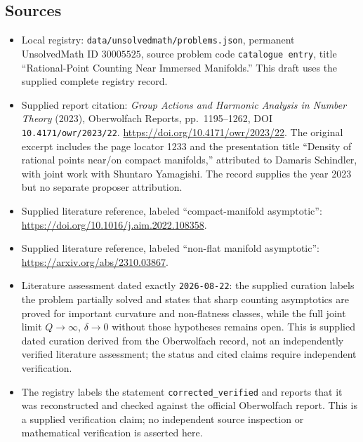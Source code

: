 \documentclass[11pt]{article}
\begin{document}
\subsection{Sources}
\begin{itemize}
\item Local registry: \texttt{data/unsolvedmath/problems.json}, permanent UnsolvedMath ID \(30005525\), source problem code \texttt{catalogue entry}, title ``Rational-Point Counting Near Immersed Manifolds.'' This draft uses the supplied complete registry record.
\item Supplied report citation: \emph{Group Actions and Harmonic Analysis in Number Theory} (2023), Oberwolfach Reports, pp.\ 1195--1262, DOI \texttt{10.4171/owr/2023/22}. \url{https://doi.org/10.4171/owr/2023/22}. The original excerpt includes the page locator 1233 and the presentation title ``Density of rational points near/on compact manifolds,'' attributed to Damaris Schindler, with joint work with Shuntaro Yamagishi. The record supplies the year 2023 but no separate proposer attribution.
\item Supplied literature reference, labeled ``compact-manifold asymptotic'': \url{https://doi.org/10.1016/j.aim.2022.108358}.
\item Supplied literature reference, labeled ``non-flat manifold asymptotic'': \url{https://arxiv.org/abs/2310.03867}.
\item Literature assessment dated exactly \texttt{2026-08-22}: the supplied curation labels the problem partially solved and states that sharp counting asymptotics are proved for important curvature and non-flatness classes, while the full joint limit \(Q\to\infty\), \(\delta\to0\) without those hypotheses remains open. This is supplied dated curation derived from the Oberwolfach record, not an independently verified literature assessment; the status and cited claims require independent verification.
\item The registry labels the statement \texttt{corrected\_verified} and reports that it was reconstructed and checked against the official Oberwolfach report. This is a supplied verification claim; no independent source inspection or mathematical verification is asserted here.
\end{itemize}
\end{document}

